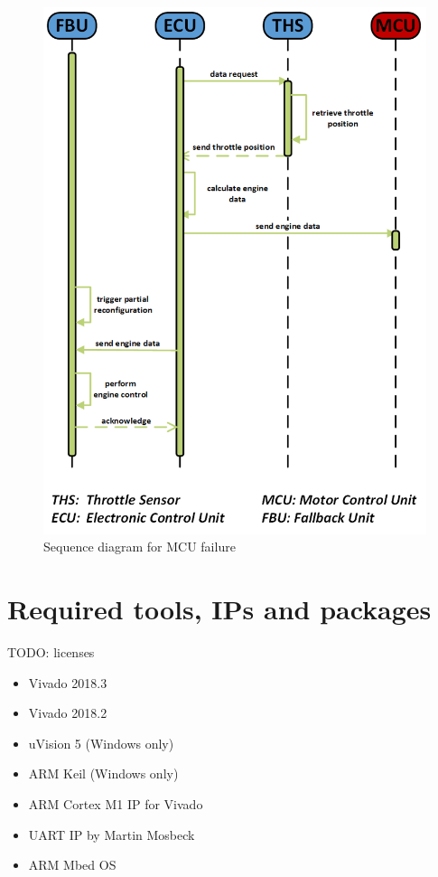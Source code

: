 \begin{figure}[h!]
    \centering
    \includegraphics[width=\textwidth]{figures/sequence_mcu_fail.png}
    \caption{Sequence diagram for \gls{MCU} failure}\label{fig:sequenceMCUFailure}
\end{figure}

\section{Required tools, \glspl{IP} and packages}
TODO: licenses
\begin{itemize}
    \item Vivado 2018.3
    \item Vivado 2018.2
    \item uVision 5 (Windows only)
    \item ARM Keil (Windows only)
    \item ARM Cortex M1 IP for Vivado
    \item UART IP by Martin Mosbeck
    \item ARM Mbed OS
\end{itemize}
